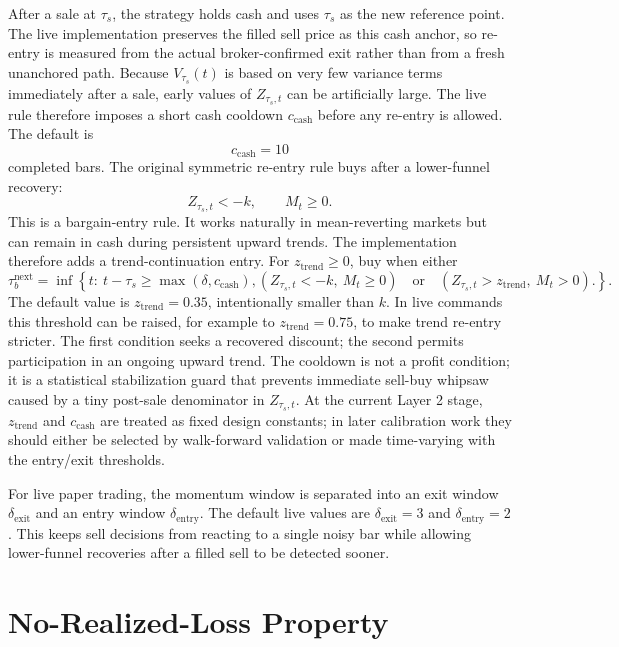 \documentclass[11pt]{article}
\begin{document}
After a sale at \(\tau_s\), the strategy holds cash and uses \(\tau_s\) as the new reference point. The live implementation preserves the filled sell price as this cash anchor, so re-entry is measured from the actual broker-confirmed exit rather than from a fresh unanchored path. Because \(V_{\tau_s}(t)\) is based on very few variance terms immediately after a sale, early values of \(Z_{\tau_s,t}\) can be artificially large. The live rule therefore imposes a short cash cooldown \(c_{\mathrm{cash}}\) before any re-entry is allowed. The default is
\[
c_{\mathrm{cash}}=10
\]
completed bars. The original symmetric re-entry rule buys after a lower-funnel recovery:
\[
Z_{\tau_s,t}<-k,
\qquad
M_t\geq 0.
\]
This is a bargain-entry rule. It works naturally in mean-reverting markets but can remain in cash during persistent upward trends. The implementation therefore adds a trend-continuation entry. For \(z_{\mathrm{trend}}\geq 0\), buy when either
\[
\tau_b^{\mathrm{next}}
=
\inf\left\{
t:\ t-\tau_s\geq \max(\delta,c_{\mathrm{cash}}),
\left(Z_{\tau_s,t}<-k,\ M_t\geq 0\right)
\quad\text{or}\quad
\left(Z_{\tau_s,t}>z_{\mathrm{trend}},\ M_t>0\right).
\right\}.
\]
The default value is \(z_{\mathrm{trend}}=0.35\), intentionally smaller than \(k\). In live commands this threshold can be raised, for example to \(z_{\mathrm{trend}}=0.75\), to make trend re-entry stricter. The first condition seeks a recovered discount; the second permits participation in an ongoing upward trend. The cooldown is not a profit condition; it is a statistical stabilization guard that prevents immediate sell-buy whipsaw caused by a tiny post-sale denominator in \(Z_{\tau_s,t}\). At the current Layer 2 stage, \(z_{\mathrm{trend}}\) and \(c_{\mathrm{cash}}\) are treated as fixed design constants; in later calibration work they should either be selected by walk-forward validation or made time-varying with the entry/exit thresholds.

For live paper trading, the momentum window is separated into an exit window \(\delta_{\mathrm{exit}}\) and an entry window \(\delta_{\mathrm{entry}}\). The default live values are \(\delta_{\mathrm{exit}}=3\) and \(\delta_{\mathrm{entry}}=2\). This keeps sell decisions from reacting to a single noisy bar while allowing lower-funnel recoveries after a filled sell to be detected sooner.

\section{No-Realized-Loss Property}
\end{document}
